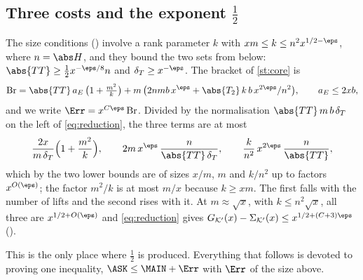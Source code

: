 \subsection{Three costs and the exponent $\tfrac12$}\label{sec:balance}
The size conditions \lvS{} () involve a rank parameter $k$ with
$xm\le k\le n^2x^{1/2-\eps}$, where $n=\abs H$, and they bound the two sets from below:
$\abs{TT}\ge\tfrac12x^{-\eps/8}n$ and $\delta_T\ge x^{-\eps}$. The bracket of \cref{st:core} is
\[
\mathrm{Br}=\abs{TT}\,a_E\,\bigl(1+\tfrac{m^2}{k}\bigr)
   +m\,\bigl(2nmb\,x^{\eps}+\abs{T_2}\,k\,b\,x^{2\eps}/n^2\bigr),\qquad a_E\le 2xb,
\]
and we write $\Err=x^{C\eps}\,\mathrm{Br}$.
Divided by the normalisation $\abs{TT}\,m\,b\,\delta_T$ on the left of \eqref{eq:reduction}, the
three terms are at most
\[
\frac{2x}{m\,\delta_T}\Bigl(1+\frac{m^2}{k}\Bigr),\qquad
2m\,x^{\eps}\,\frac{n}{\abs{TT}\,\delta_T},\qquad
\frac{k}{n^{2}}\,x^{2\eps}\,\frac{n}{\abs{TT}},
\]
which by the two lower bounds are of sizes $x/m$, $m$ and $k/n^2$ up to factors $x^{O(\eps)}$;
the factor $m^2/k$ is at most $m/x$ because $k\ge xm$. The first falls with the number of lifts
and the second rises with it. At $m\approx\sqrt x$, with $k\le n^2\sqrt x$, all three are
$x^{1/2+O(\eps)}$ and \eqref{eq:reduction} gives
$G_{\mathcal K'}(x)-\Sigma_{\mathcal K'}(x)\le x^{1/2+(C+3)\eps}$ \lvS{} ().

\begin{remark}
This is the only place where $\tfrac12$ is produced. Everything that follows is devoted to
proving one inequality, $\ASK\le\MAIN+\Err$ with $\Err$ of the size above.
\end{remark}
